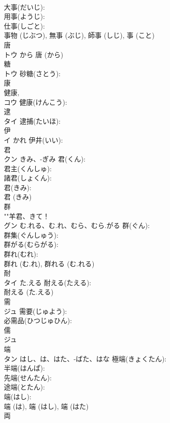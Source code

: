 \documentclass[8pt]{extreport}
\begin{document}
\begin{CJK}{UTF8}{min}
\\	大事(だいじ): 
\\	用事(ようじ): 
\\	仕事(しごと): 
\\	事物 (じぶつ), 無事 (ぶじ), 師事 (しじ), 事 (こと)
\\	唐			
\\	トウ	から		唐 (から)
\\	糖			
\\	トウ		砂糖(さとう): 
\\	康			
\\	健康, 
\\	コウ		健康(けんこう): 
\\	逮			
\\	タイ		逮捕(たいほ): 
\\	伊			
\\	イ	かれ	伊井(いい): 
\\	君			
\\	クン	きみ、-ぎみ	君(くん): 
\\	君主(くんしゅ): 
\\	諸君(しょくん): 
\\	君(きみ): 
\\	君 (きみ)
\\	群			
\\	""羊君、きて！
\\	グン	む.れる、む.れ、むら、むら.がる	群(ぐん): 
\\	群集(ぐんしゅう): 
\\	群がる(むらがる): 
\\	群れ(むれ): 
\\	群れ (む.れ), 群れる (む.れる)
\\	耐			
\\	タイ	た.える	耐える(たえる): 
\\	耐える (た.える)
\\	需			
\\	ジュ		需要(じゅよう): 
\\	必需品(ひつじゅひん): 
\\	儒			
\\	ジュ			
\\	端			
\\	タン	はし、は、はた、-ばた、はな	極端(きょくたん): 
\\	半端(はんぱ): 
\\	先端(せんたん): 
\\	途端(とたん): 
\\	端(はし): 
\\	端 (は), 端 (はし), 端 (はた)
\\	両			

\end{CJK}
\end{document}
